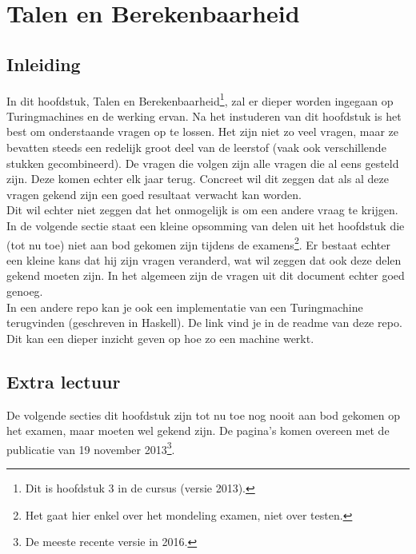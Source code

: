 \documentclass[10pt,a4paper]{article}
\begin{document}
\newpage


\section{Talen en Berekenbaarheid}

\subsection{Inleiding}

\vspace{3mm}
In dit hoofdstuk, Talen en Berekenbaarheid\footnote{Dit is hoofdstuk 3 in de cursus (versie 2013).}, zal er dieper worden ingegaan op Turingmachines en de werking ervan. Na het instuderen van dit hoofdstuk is het best om onderstaande vragen op te lossen. Het zijn niet zo veel vragen, maar ze bevatten steeds een redelijk groot deel van de leerstof (vaak ook verschillende stukken gecombineerd). De vragen die volgen zijn alle vragen die al eens gesteld zijn. Deze komen echter elk jaar terug. Concreet wil dit zeggen dat als al deze vragen gekend zijn een goed resultaat verwacht kan worden.\\

Dit wil echter niet zeggen dat het onmogelijk is om een andere vraag te krijgen. In de volgende sectie staat een kleine opsomming van delen uit het hoofdstuk die (tot nu toe) niet aan bod gekomen zijn tijdens de examens\footnote{Het gaat hier enkel over het mondeling examen, niet over testen.}. Er bestaat echter een kleine kans dat hij zijn vragen veranderd, wat wil zeggen dat ook deze delen gekend moeten zijn. In het algemeen zijn de vragen uit dit document echter goed genoeg.\\

In een andere repo kan je ook een implementatie van een Turingmachine terugvinden (geschreven in Haskell). De link vind je in de readme van deze repo. Dit kan een dieper inzicht geven op hoe zo een machine werkt.

\subsection{Extra lectuur}

De volgende secties dit hoofdstuk zijn tot nu toe nog nooit aan bod gekomen op het examen, maar moeten wel gekend zijn. De pagina's komen overeen met de publicatie van 19 november 2013\footnote{De meeste recente versie in 2016.}.
\end{document}

